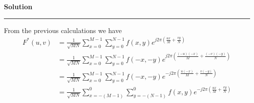 \documentclass[a4paper]{article}
\newenvironment{solution}[2][]{%
    \begin{mdframed}[linecolor=green!60!black, linewidth=2pt, roundcorner=10pt, backgroundcolor=green!5!white, skipabove=12pt, skipbelow=12pt]%
        \textbf{\large #2} %
        \par\noindent\rule{\textwidth}{0.4pt} %
        \vspace{0.5em} %
}{%
    \end{mdframed}%
}
\begin{document}
\begin{solution}{Solution}
  From the previous calculations we have 
  \begin{align*}
    F^{*}(u,v) &= \frac{1}{\sqrt{MN}}\sum\limits_{x = 0}^{M - 1}\sum\limits_{y = 0}^{N - 1} 
    f(x,y) e^{j2\pi \left(\frac{ux}{M} + \frac{vy}{N}\right)} \\
    &= \frac{1}{\sqrt{MN}}\sum\limits_{x = 0}^{M - 1}\sum\limits_{y = 0}^{N - 1} 
    f(-x,-y) e^{j2\pi \left(\frac{(-u)(-x)}{M} + \frac{(-v)(-y)}{N}\right)} \\
    &= \frac{1}{\sqrt{MN}}\sum\limits_{x = 0}^{M - 1}\sum\limits_{y = 0}^{N - 1} 
    f(-x,-y) e^{-j2\pi \left(\frac{u(-x)}{M} + \frac{v(-y)}{N}\right)} \\
    &= \frac{1}{\sqrt{MN}}\sum\limits_{x = -(M - 1)}^{0}\sum\limits_{y = -(N - 1)}^{0} 
    f(x,y) e^{-j2\pi \left(\frac{ux}{M} + \frac{vy}{N}\right)}
  \end{align*}
\end{solution}
\end{document}
